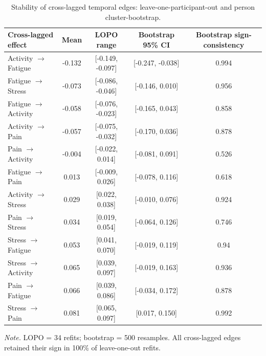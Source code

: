 \begin{table}[H]
\raggedright
\caption{Stability of cross-lagged temporal edges: leave-one-participant-out and person cluster-bootstrap.}
\label{tab:robust}
\footnotesize
\begingroup
\setlength{\tabcolsep}{4pt}
\renewcommand{\arraystretch}{1.08}
\noindent
\begin{tabular*}{\textwidth}{@{\extracolsep{\fill}}lcccc@{}}
\toprule
Cross-lagged effect & Mean & LOPO range & Bootstrap 95\% CI & Bootstrap sign-consistency \\
\midrule
Activity $\rightarrow$ Fatigue & -0.132 & [-0.149, -0.097] & [-0.247, -0.038] & 0.994 \\
Fatigue $\rightarrow$ Stress & -0.073 & [-0.086, -0.046] & [-0.146, 0.010] & 0.956 \\
Fatigue $\rightarrow$ Activity & -0.058 & [-0.076, -0.023] & [-0.165, 0.043] & 0.858 \\
Activity $\rightarrow$ Pain & -0.057 & [-0.075, -0.032] & [-0.170, 0.036] & 0.878 \\
Pain $\rightarrow$ Activity & -0.004 & [-0.022, 0.014] & [-0.081, 0.091] & 0.526 \\
Fatigue $\rightarrow$ Pain & 0.013 & [-0.009, 0.026] & [-0.078, 0.116] & 0.618 \\
Activity $\rightarrow$ Stress & 0.029 & [0.022, 0.038] & [-0.010, 0.076] & 0.924 \\
Pain $\rightarrow$ Stress & 0.034 & [0.019, 0.054] & [-0.064, 0.126] & 0.746 \\
Stress $\rightarrow$ Fatigue & 0.053 & [0.041, 0.070] & [-0.019, 0.119] & 0.94 \\
Stress $\rightarrow$ Activity & 0.065 & [0.039, 0.097] & [-0.019, 0.163] & 0.936 \\
Pain $\rightarrow$ Fatigue & 0.066 & [0.039, 0.086] & [-0.034, 0.172] & 0.878 \\
Stress $\rightarrow$ Pain & 0.081 & [0.065, 0.097] & [0.017, 0.150] & 0.992 \\
\bottomrule
\end{tabular*}
\par\vspace{3pt}\noindent\parbox{\textwidth}{\footnotesize\textit{Note.} LOPO = 34 refits; bootstrap = 500 resamples. All cross-lagged edges retained their sign in 100\% of leave-one-out refits.}
\endgroup
\end{table}
